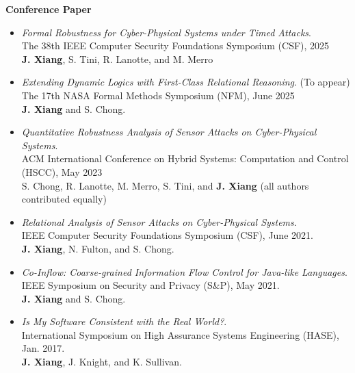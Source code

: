 \documentclass[11pt]{article}
\begin{document}
\textbf{Conference Paper}

\begin{itemize}
  \item \textit{Formal Robustness for Cyber-Physical Systems under Timed Attacks}. \\
  The 38th IEEE Computer Security Foundations Symposium (CSF), 2025 \\
  \textbf{J. Xiang}, S. Tini, R. Lanotte, and M. Merro

  \item \textit{Extending Dynamic Logics with First-Class Relational Reasoning}. (To appear) \\
  The 17th NASA Formal Methods Symposium (NFM), June 2025 \\
  \textbf{J. Xiang} and S. Chong. 

  \item \textit{Quantitative Robustness Analysis of Sensor Attacks on Cyber-Physical Systems}. \\
  ACM International Conference on Hybrid Systems: Computation and Control (HSCC), May 2023 \\
  S. Chong, R. Lanotte, M. Merro, S. Tini, and \textbf{J. Xiang}
  (all authors contributed equally)

  \item \textit{Relational Analysis of Sensor Attacks on Cyber-Physical Systems}. %
  \\
  IEEE Computer Security Foundations Symposium (CSF),  June 2021. \\
  \textbf{J. Xiang}, N. Fulton, and S. Chong. 
  
\item \textit{Co-Inflow: Coarse-grained Information Flow Control for Java-like Languages}. %
\\
  IEEE Symposium on Security and Privacy (S\&P), May 2021.  \\
  \textbf{J. Xiang} and S. Chong.
  
\item \textit{Is My Software Consistent with the Real World?}. 
\\
  International Symposium on High Assurance Systems Engineering (HASE), Jan. 2017.  \\
  \textbf{J. Xiang}, J. Knight, and K. Sullivan.


\end{itemize}
\end{document}
